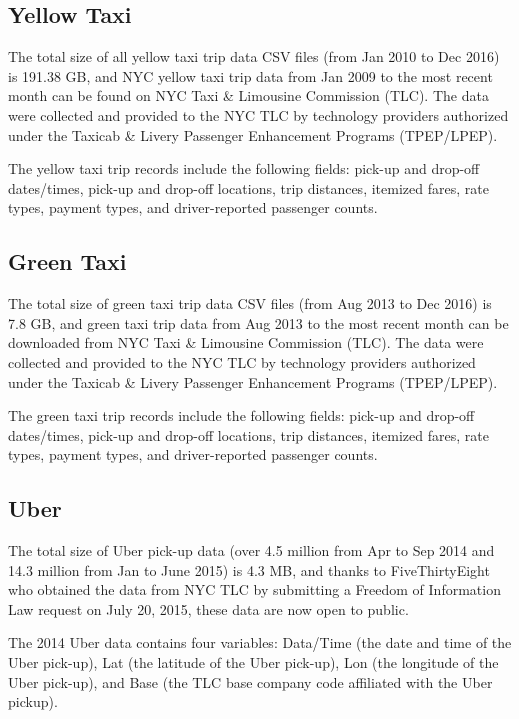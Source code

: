 \documentclass[12pt,twoside]{reedthesis}
\theoremstyle{definition}
\theoremstyle{definition}
\theoremstyle{definition}
\theoremstyle{remark}
\begin{document}
\subsection{Yellow Taxi}\label{yellow-taxi-2}

The total size of all yellow taxi trip data CSV files (from Jan 2010 to
Dec 2016) is 191.38 GB, and NYC yellow taxi trip data from Jan 2009 to
the most recent month can be found on NYC Taxi \& Limousine Commission
(TLC). The data were collected and provided to the NYC TLC by technology
providers authorized under the Taxicab \& Livery Passenger Enhancement
Programs (TPEP/LPEP).

The yellow taxi trip records include the following fields: pick-up and
drop-off dates/times, pick-up and drop-off locations, trip distances,
itemized fares, rate types, payment types, and driver-reported passenger
counts.

\subsection{Green Taxi}\label{green-taxi-2}

The total size of green taxi trip data CSV files (from Aug 2013 to Dec
2016) is 7.8 GB, and green taxi trip data from Aug 2013 to the most
recent month can be downloaded from NYC Taxi \& Limousine Commission
(TLC). The data were collected and provided to the NYC TLC by technology
providers authorized under the Taxicab \& Livery Passenger Enhancement
Programs (TPEP/LPEP).

The green taxi trip records include the following fields: pick-up and
drop-off dates/times, pick-up and drop-off locations, trip distances,
itemized fares, rate types, payment types, and driver-reported passenger
counts.

\subsection{Uber}\label{uber-2}

The total size of Uber pick-up data (over 4.5 million from Apr to Sep
2014 and 14.3 million from Jan to June 2015) is 4.3 MB, and thanks to
FiveThirtyEight who obtained the data from NYC TLC by submitting a
Freedom of Information Law request on July 20, 2015, these data are now
open to public.

The 2014 Uber data contains four variables: Data/Time (the date and time
of the Uber pick-up), Lat (the latitude of the Uber pick-up), Lon (the
longitude of the Uber pick-up), and Base (the TLC base company code
affiliated with the Uber pickup).
\end{document}
